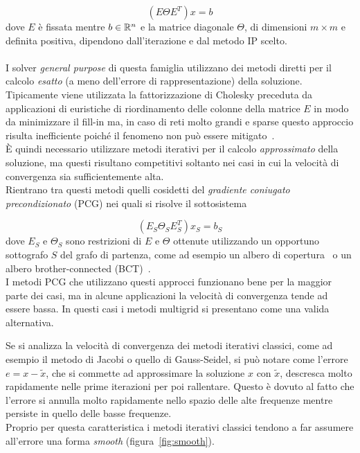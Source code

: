 \begin{equation}
\label{eqn:IP}
(E \Theta E^T ) x = b
\end{equation}
dove $E$ è fissata mentre $b \in \mathbb{R}^n$ e la matrice diagonale $\Theta$, di dimensioni $m \times m$ e definita positiva, dipendono dall'iterazione e dal metodo IP scelto.\\
\\
I solver \emph{general purpose} di questa famiglia utilizzano dei metodi diretti per il calcolo \emph{esatto} (a meno dell'errore di rappresentazione) della soluzione. Tipicamente viene utilizzata la fattorizzazione di Cholesky preceduta da applicazioni di euristiche di riordinamento delle colonne della matrice $E$ in modo da minimizzare il fill-in ma, in caso di reti molto grandi e sparse questo approccio risulta inefficiente poiché il fenomeno non può essere mitigato~\cite{MGM_frangio}.\\
È quindi necessario utilizzare metodi iterativi per il calcolo \emph{approssimato} della soluzione, ma questi risultano competitivi soltanto nei casi in cui la velocità di convergenza sia sufficientemente alta.\\
Rientrano tra questi metodi quelli cosidetti del \emph{gradiente coniugato precondizionato} (PCG) nei quali si risolve il sottosistema

\begin{equation}
(E_S \Theta_S E_S^T )x_S = b_S
\end{equation}
dove $E_S$ e $\Theta_S$ sono restrizioni di $E$ e $\Theta$ ottenute utilizzando un opportuno sottografo $S$ del grafo di partenza, come ad esempio un albero di copertura~\cite{KKT_frangio} o un albero brother-connected (BCT)~\cite{Prim_frangio}.\\
I metodi PCG che utilizzano questi approcci funzionano bene per la maggior parte dei casi, ma in alcune applicazioni la velocità di convergenza tende ad essere bassa.
In questi casi i metodi multigrid si presentano come una valida alternativa.\\

\clearpage
{}

Se si analizza la velocità di convergenza dei metodi iterativi classici, come ad esempio il metodo di Jacobi o quello di Gauss-Seidel, si può notare come l'errore $e = x - \tilde{x}$, che si commette ad approssimare la soluzione $x$ con $\tilde{x}$, descresca molto rapidamente nelle prime iterazioni per poi rallentare.
Questo è dovuto al fatto che l'errore si annulla molto rapidamente nello spazio delle alte frequenze mentre persiste in quello delle basse frequenze.\\
Proprio per questa caratteristica i metodi iterativi classici tendono a far assumere all'errore una forma \emph{smooth} (figura~\vref{fig:smooth}).

